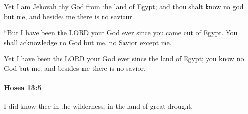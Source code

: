 			\begin{versebox}
					\item[BHS] 
					\item[LXX] 
					\item[ASV] Yet I am Jehovah thy God from the land of Egypt; and thou shalt know no god but me, and besides me there is no saviour.
					\item[NIV] “But I have been the LORD your God ever since you came out of Egypt. You shall acknowledge no God but me, no Savior except me.
					\item[NRSV] Yet I have been the LORD your God ever since the land of Egypt; you know no God but me, and besides me there is no savior.
			\end{versebox}

		\paragraph{Hosea 13:5} %
			\label{HOSEA-13-5}

			I did know thee in the wilderness, in the land of great drought.

